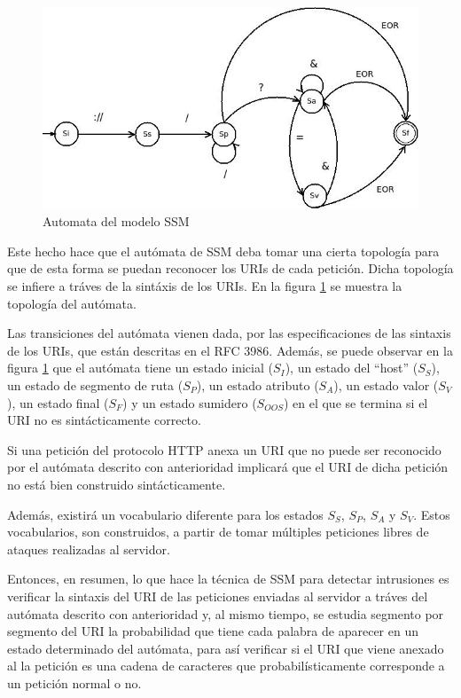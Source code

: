 \begin{figure}
\begin{center}
  \includegraphics[width=\linewidth]{./img/ssm.jpeg}
  \caption{Automata del modelo SSM}
  \label{fig:ssm}
\end{center}

\end{figure}

Este hecho hace que el autómata de SSM deba tomar una cierta topolog\'ia para que de esta forma se puedan reconocer los URIs de cada petici\'on. Dicha topolog\'ia se infiere a tráves de la sint\'axis de los URIs. En la figura \ref{fig:ssm} se muestra la topolog\'ia del autómata.

Las transiciones del autómata vienen dada, por las especificaciones de las sintaxis de los URIs, que est\'an descritas en el RFC 3986. Adem\'as, se puede observar en la figura \ref{fig:ssm} que el autómata tiene un estado inicial ($S_{I}$), un estado del ``host'' ($S_{S}$), un estado de segmento de ruta ($S_{P}$), un estado atributo ($S_{A}$), un estado valor ($S_{V}$), un estado final ($S_{F}$) y un estado sumidero ($S_{OOS}$) en el que se termina si el URI no es sint\'acticamente correcto.

Si una petici\'on del protocolo HTTP anexa un URI que no puede ser reconocido por el autómata descrito con anterioridad implicar\'a que el URI de dicha petici\'on no est\'a bien construido sintácticamente.

Adem\'as, existirá un vocabulario diferente para los estados $S_{S}$, $S_{P}$, $S_{A}$ y $S_{V}$. Estos vocabularios, son construidos, a partir de tomar m\'ultiples peticiones libres de ataques realizadas al servidor. 

Entonces, en resumen, lo que hace la t\'ecnica de SSM para detectar intrusiones es verificar la sintaxis del URI de las peticiones enviadas al servidor a tráves del autómata descrito con anterioridad y, al mismo tiempo, se estudia segmento por segmento del URI la probabilidad que tiene cada palabra de aparecer en un estado determinado del autómata, para as\'i verificar si el URI que viene anexado al la petici\'on es una cadena de caracteres que probabilísticamente corresponde a un petici\'on normal o no.

